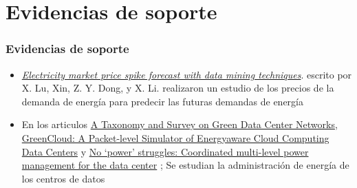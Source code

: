 \documentclass[11pt]{beamer}					%
\begin{document}
\section{Evidencias de soporte}
\begin{frame}[fragile]						%
	\frametitle{Evidencias de soporte}					
	\begin{center}
	\begin{itemize}
		\item \href{http://www.sciencedirect.com/science/article/pii/S0378779604001257}{\textit{Electricity market price spike forecast with data mining techniques}}. escrito por X. Lu, Xin, Z. Y. Dong, y X. Li. realizaron un estudio de   los precios de la demanda de energía para predecir las futuras demandas de energía 
		
		\item En los articulos 
			\href{http://sameekhan.seecs.nust.edu.pk/pub/B_K_2013_FGCS.pdf}{A Taxonomy and Survey on Green Data Center Networks},	
			\href{http://ieeexplore.ieee.org/xpl/login.jsp?tp=&arnumber=5683561&url=http\%3A\%2F\%2Fieeexplore.ieee.org\%2Fiel5\%2F5682081\%2F5683069\%2F05683561.pdf\%3Farnumber\%3D5683561}{GreenCloud: A Packet-level Simulator of Energyaware Cloud Computing Data Centers} y 	
			 \href{http://www.hpl.hp.com/techreports/2007/HPL-2007-194.pdf}{No ‘power’ struggles: Coordinated multi-level power management for the data center} ; Se estudian la administración de energía de los centros de datos
		
	\end{itemize}
					
	\end{center}
\end{frame}		
				
\end{document}
